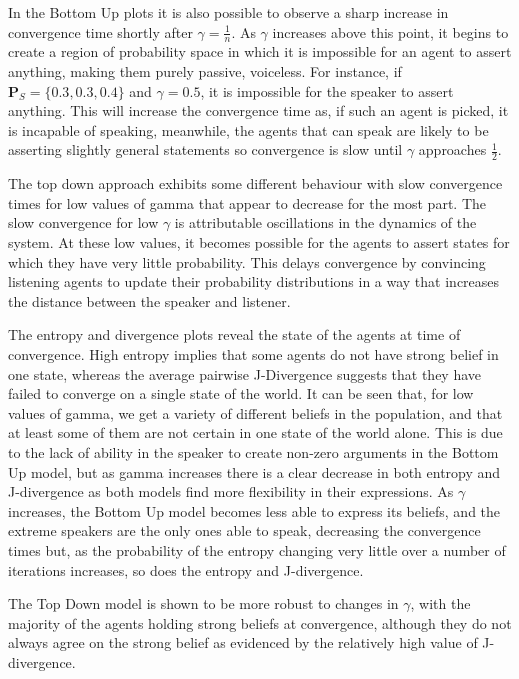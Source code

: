 In the Bottom Up plots it is also possible to observe a sharp increase in convergence time shortly after $ \gamma = \frac{1}{n}$. As $\gamma$ increases above this point, it begins to create a region of probability space in which it is impossible for an agent to assert anything, making them purely passive, voiceless. For instance, if $\mathbf{P}_S =\{ 0.3, 0.3, 0.4\}$ and $\gamma = 0.5$, it is impossible for the speaker to assert anything. This will increase the convergence time as, if such an agent is picked, it is incapable of speaking, meanwhile, the agents that can speak are likely to be asserting slightly general statements so convergence is slow until $\gamma$ approaches $\frac{1}{2}$. 

The top down approach exhibits some different behaviour with slow convergence times for low values of gamma that appear to decrease for the most part. The slow convergence for low $\gamma$ is attributable oscillations in the dynamics of the system. At these low values, it becomes possible for the agents to assert states for which they have very little probability. This delays convergence by convincing listening agents to update their probability distributions in a way that increases the distance between the speaker and listener. 

The entropy and divergence plots reveal the state of the agents at time of convergence. High entropy implies that some agents do not have strong belief in one state, whereas the average pairwise J-Divergence suggests that they have failed to converge on a single state of the world. It can be seen that, for low values of gamma, we get a variety of different beliefs in the population, and that at least some of them are not certain in one state of the world alone. This is due to the lack of ability in the speaker to create non-zero arguments in the Bottom Up model, but as gamma increases there is a clear decrease in both entropy and J-divergence as both models find more flexibility in their expressions. As $\gamma$ increases, the Bottom Up model becomes less able to express its beliefs, and the extreme speakers are the only ones able to speak, decreasing the convergence times but, as the probability of the entropy changing very little over a number of iterations increases, so does the entropy and J-divergence. 

The Top Down model is shown to be more robust to changes in $\gamma$, with the majority of the agents holding strong beliefs at convergence, although they do not always agree on the strong belief as evidenced by the relatively high value of J-divergence. 


